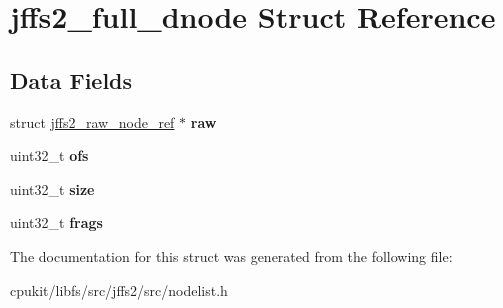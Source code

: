 \hypertarget{structjffs2__full__dnode}{}\section{jffs2\+\_\+full\+\_\+dnode Struct Reference}
\label{structjffs2__full__dnode}
\subsection*{Data Fields}
\begin{DoxyCompactItemize}
\item 
\mbox{\label{structjffs2__full__dnode_a451287f28ef106405509f040ca33d4d0}} 
struct \mbox{\hyperlink{structjffs2__raw__node__ref}{jffs2\+\_\+raw\+\_\+node\+\_\+ref}} $\ast$ {\bfseries raw}
\item 
\mbox{\label{structjffs2__full__dnode_a0e6593999264b1aca41868e1ada55929}} 
uint32\+\_\+t {\bfseries ofs}
\item 
\mbox{\label{structjffs2__full__dnode_a647253dd40af8e602919d4f987c6a71c}} 
uint32\+\_\+t {\bfseries size}
\item 
\mbox{\label{structjffs2__full__dnode_a11bbfc3972367c57fdf68893ecdf7f28}} 
uint32\+\_\+t {\bfseries frags}
\end{DoxyCompactItemize}


The documentation for this struct was generated from the following file\+:\begin{DoxyCompactItemize}
\item 
cpukit/libfs/src/jffs2/src/nodelist.\+h\end{DoxyCompactItemize}
